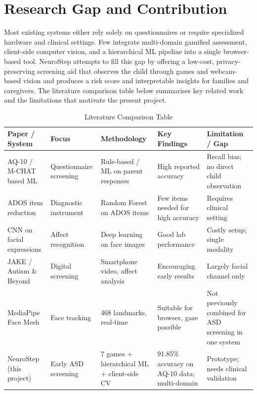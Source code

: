 \documentclass[12pt,a4paper]{report}
\begin{document}
\section{Research Gap and Contribution}
Most existing systems either rely solely on questionnaires or require specialized hardware and clinical settings. Few integrate multi-domain gamified assessment, client-side computer vision, and a hierarchical ML pipeline into a single browser-based tool. NeuroStep attempts to fill this gap by offering a low-cost, privacy-preserving screening aid that observes the child through games and webcam-based vision and produces a risk score and interpretable insights for families and caregivers. The literature comparison table below summarises key related work and the limitations that motivate the present project.
\begin{table}[h!]
    \centering
    \caption{Literature Comparison Table}
    \renewcommand{\arraystretch}{1.4}
    \small
    \begin{tabular}{|p{2.4cm}|p{2.4cm}|p{2.8cm}|p{3.0cm}|p{3.0cm}|}
        \hline
        \textbf{Paper / System} & \textbf{Focus} & \textbf{Methodology} & \textbf{Key Findings} & \textbf{Limitation / Gap} \\
        \hline
        AQ-10 / M-CHAT based ML & Questionnaire screening & Rule-based / ML on parent responses & High reported accuracy & Recall bias; no direct child observation \\
        \hline
        ADOS item reduction & Diagnostic instrument & Random Forest on ADOS items & Few items needed for high accuracy & Requires clinical setting \\
        \hline
        CNN on facial expressions & Affect recognition & Deep learning on face images & Good lab performance & Costly setup; single modality \\
        \hline
        JAKE / Autism \& Beyond & Digital screening & Smartphone video, affect analysis & Encouraging early results & Largely facial channel only \\
        \hline
        MediaPipe Face Mesh & Face tracking & 468 landmarks, real-time & Suitable for browser, gaze possible & Not previously combined for ASD screening in one system \\
        \hline
        NeuroStep (this project) & Early ASD screening & 7 games + hierarchical ML + client-side CV & 91.85\% accuracy on AQ-10 data; multi-domain & Prototype; needs clinical validation \\
        \hline
    \end{tabular}
\end{table}
\end{document}
